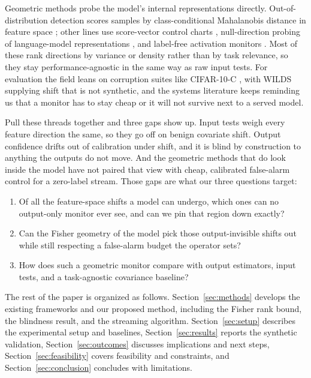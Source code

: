 \documentclass[sigconf,anonymous]{acmart}
\begin{document}
Geometric methods probe the model's internal representations directly. Out-of-distribution
detection scores samples by class-conditional Mahalanobis distance in feature
space \cite{lee2018mahalanobis}; other lines use score-vector control charts
\cite{zhang2023score}, null-direction probing of language-model
representations \cite{pandey2025zdp}, and label-free activation monitors
\cite{komorniczak2024parallel}. Most of these rank directions by variance or
density rather than by task relevance, so they stay performance-agnostic in
the same way as raw input tests. For evaluation the field leans on corruption
suites like CIFAR-10-C \cite{hendrycks2019benchmarking}, with WILDS
\cite{koh2021wilds} supplying shift that is not synthetic, and the systems
literature \cite{sculley2015debt} keeps reminding us that a monitor has to
stay cheap or it will not survive next to a served model.

Pull these threads together and three gaps show up. Input tests weigh every
feature direction the same, so they go off on benign covariate shift. Output
confidence drifts out of calibration under shift, and it is blind by
construction to anything the outputs do not move. And the geometric methods
that do look inside the model have not paired that view with cheap, calibrated
false-alarm control for a zero-label stream. Those gaps are what our three
questions target:

\begin{enumerate}
\item Of all the feature-space shifts a model can undergo, which ones can no
  output-only monitor ever see, and can we pin that region down exactly?
\item Can the Fisher geometry of the model pick those output-invisible shifts
  out while still respecting a false-alarm budget the operator sets?
\item How does such a geometric monitor compare with output estimators, input
  tests, and a task-agnostic covariance baseline?
\end{enumerate}

The rest of the paper is organized as follows. Section~\ref{sec:methods}
develops the existing frameworks and our proposed method, including the
Fisher rank bound, the blindness result, and the streaming algorithm.
Section~\ref{sec:setup} describes the experimental setup and baselines,
Section~\ref{sec:results} reports the synthetic validation,
Section~\ref{sec:outcomes} discusses implications and next steps,
Section~\ref{sec:feasibility} covers feasibility and constraints, and
Section~\ref{sec:conclusion} concludes with limitations.
\end{document}
